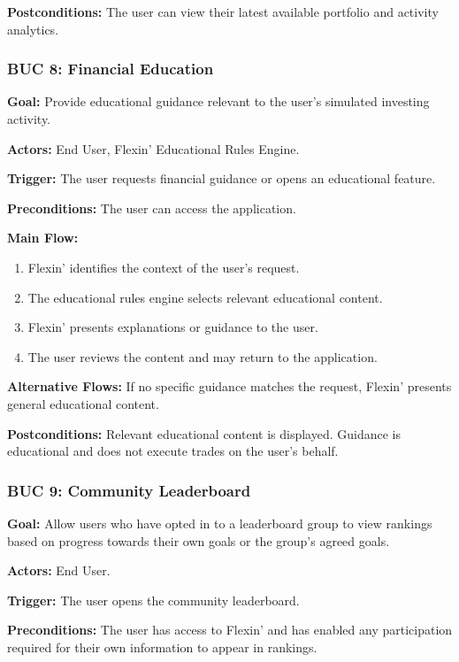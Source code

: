 \documentclass[12pt]{article}
\begin{document}
\textbf{Postconditions:} The user can view their latest available portfolio
and activity analytics.

\subsubsection*{BUC 8: Financial Education}

\textbf{Goal:} Provide educational guidance relevant to the user's simulated
investing activity.

\textbf{Actors:} End User, Flexin' Educational Rules Engine.

\textbf{Trigger:} The user requests financial guidance or opens an educational
feature.

\textbf{Preconditions:} The user can access the application.

\textbf{Main Flow:}
\begin{enumerate}
    \item Flexin' identifies the context of the user's request.
    \item The educational rules engine selects relevant educational content.
    \item Flexin' presents explanations or guidance to the user.
    \item The user reviews the content and may return to the application.
\end{enumerate}

\textbf{Alternative Flows:} If no specific guidance matches the request,
Flexin' presents general educational content.

\textbf{Postconditions:} Relevant educational content is displayed. Guidance
is educational and does not execute trades on the user's behalf.

\subsubsection*{BUC 9: Community Leaderboard}

\textbf{Goal:} Allow users who have opted in to a leaderboard group to view
rankings based on progress towards their own goals or the group's agreed
goals.

\textbf{Actors:} End User.

\textbf{Trigger:} The user opens the community leaderboard.

\textbf{Preconditions:} The user has access to Flexin' and has enabled any
participation required for their own information to appear in rankings.
\end{document}
